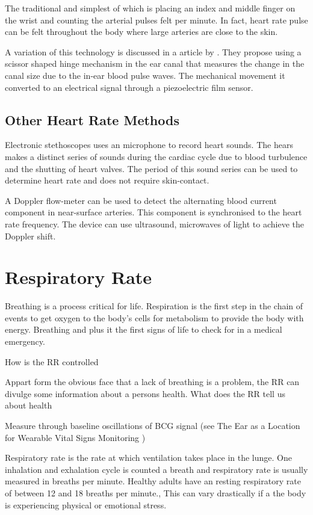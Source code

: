 The traditional and simplest of which is placing an index and middle finger on the wrist and counting the arterial pulses felt per minute. In fact, heart rate pulse can be felt throughout the body where large arteries are close to the skin.

A variation of this technology is discussed in a article by \cite{park2015wearable}. They propose using a scissor shaped hinge mechanism in the ear canal that measures the change in the canal size due to the in-ear blood pulse waves. The mechanical movement it converted to an electrical signal through a piezoelectric film sensor.

\subsection{Other Heart Rate Methods}
Electronic stethoscopes uses an microphone to record heart sounds. The hears makes a distinct series of sounds during the cardiac cycle due to blood turbulence and the shutting of heart valves. The period of this sound series can be used to determine heart rate and does not require skin-contact.

A Doppler flow-meter can be used to detect the alternating blood current component in near-surface arteries. This component is synchronised to the heart rate frequency. The device can use ultrasound, microwaves of light to achieve the Doppler shift.

\section{Respiratory Rate}
Breathing is a process critical for life. Respiration is the first step in the chain of events to get oxygen to the body's cells for metabolism to provide the body with energy. Breathing and plus it the first signs of life to check for in a medical emergency. %

How is the RR controlled

Appart form the obvious face that a lack of breathing is a problem, the RR can divulge some information about a persons health. What does the RR tell us about health


Measure through baseline oscillations of BCG signal (see The Ear as a Location for Wearable Vital Signs Monitoring \citep{da2010ear})

Respiratory rate is the rate at which ventilation takes place in the lunge. One inhalation and exhalation cycle is counted a breath and respiratory rate is usually measured in breaths per minute. Healthy adults have an resting respiratory rate of between 12 and 18 breaths per minute., This can vary drastically if a the body is experiencing physical or emotional stress.

